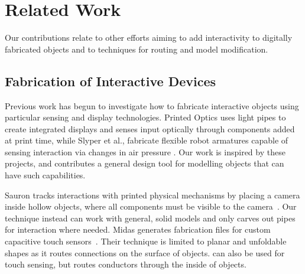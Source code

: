 \section{Related Work}
Our contributions relate to other efforts aiming to add interactivity to digitally fabricated objects and to techniques for routing and model modification.  

\subsection{Fabrication of Interactive Devices}

Previous work has begun to investigate how to fabricate interactive objects using particular sensing and display technologies. Printed Optics \cite{Willis-printedoptics} uses light pipes to create integrated displays and senses input optically through components added at print time, while Slyper et al., fabricate flexible robot armatures capable of sensing interaction via changes in air pressure \cite{Slyper-pressure}. Our work is inspired by these projects, and contributes a general design tool for modelling objects that can have such capabilities.  

Sauron tracks interactions with printed physical mechanisms by placing a camera inside hollow objects, where all components must be visible to the camera~\cite{Savage-sauron}.  Our technique instead can work with general, solid models and only carves out pipes for interaction where needed. Midas generates fabrication files for custom capacitive touch sensors~\cite{Savage-midas}.  Their technique is limited to planar and unfoldable shapes as it routes connections on the surface of objects. \systemname can also be used for touch sensing, but routes conductors through the inside of objects.


